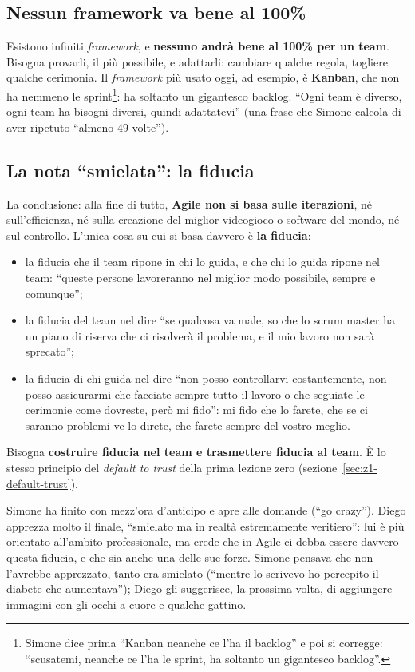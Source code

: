 \subsection{Nessun framework va bene al 100\%}

Esistono infiniti \emph{framework}, e \textbf{nessuno andrà bene al 100\% per
un team}. Bisogna provarli, il più possibile, e adattarli: cambiare qualche
regola, togliere qualche cerimonia. Il \emph{framework} più usato oggi, ad
esempio, è \textbf{Kanban}, che non ha nemmeno le sprint\footnote{Simone dice
prima ``Kanban neanche ce l'ha il backlog'' e poi si corregge: ``scusatemi,
neanche ce l'ha le sprint, ha soltanto un gigantesco backlog''.}: ha soltanto
un gigantesco backlog. ``Ogni team è diverso, ogni team ha bisogni diversi,
quindi adattatevi'' (una frase che Simone calcola di aver ripetuto ``almeno 49
volte'').

\subsection{La nota ``smielata'': la fiducia}

La conclusione: alla fine di tutto, \textbf{Agile non si basa sulle
iterazioni}, né sull'efficienza, né sulla creazione del miglior videogioco o
software del mondo, né sul controllo. L'unica cosa su cui si basa davvero è
\textbf{la fiducia}:
\begin{itemize}
  \item la fiducia che il team ripone in chi lo guida, e che chi lo guida
        ripone nel team: ``queste persone lavoreranno nel miglior modo
        possibile, sempre e comunque'';
  \item la fiducia del team nel dire ``se qualcosa va male, so che lo scrum
        master ha un piano di riserva che ci risolverà il problema, e il mio
        lavoro non sarà sprecato'';
  \item la fiducia di chi guida nel dire ``non posso controllarvi
        costantemente, non posso assicurarmi che facciate sempre tutto il
        lavoro o che seguiate le cerimonie come dovreste, però mi fido'': mi
        fido che lo farete, che se ci saranno problemi ve lo direte, che
        farete sempre del vostro meglio.
\end{itemize}
Bisogna \textbf{costruire fiducia nel team e trasmettere fiducia al team}. È
lo stesso principio del \emph{default to trust} della prima lezione zero
(sezione~\ref{sec:z1-default-trust}).

Simone ha finito con mezz'ora d'anticipo e apre alle domande (``go crazy'').
Diego apprezza molto il finale, ``smielato ma in realtà estremamente
veritiero'': lui è più orientato all'ambito professionale, ma crede che in
Agile ci debba essere davvero questa fiducia, e che sia anche una delle sue
forze. Simone pensava che non l'avrebbe apprezzato, tanto era smielato
(``mentre lo scrivevo ho percepito il diabete che aumentava''); Diego gli
suggerisce, la prossima volta, di aggiungere immagini con gli occhi a cuore e
qualche gattino.

